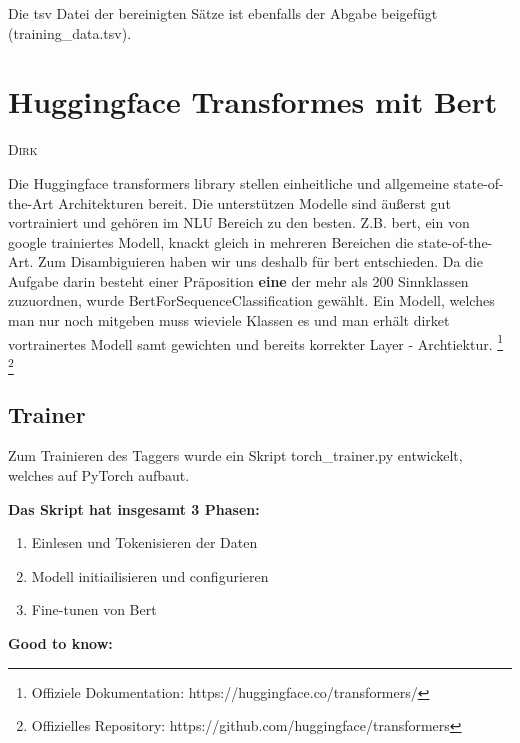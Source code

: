 \documentclass[10pt,a4paper]{article}
\newcommand{\chapterauthor}[1]{%
	{\parindent0pt\vspace*{-5pt}\hspace*{\fill}%
  \linespread{1.1}\large\scshape#1%
  \par\nobreak\vspace*{10pt}}
}
\begin{document}
Die tsv Datei der bereinigten Sätze ist ebenfalls der Abgabe beigefügt (training\_data.tsv).

\newpage

\section{Huggingface Transformes mit Bert}
\chapterauthor{Dirk}
Die Huggingface transformers library stellen einheitliche und allgemeine state-of-the-Art Architekturen bereit. Die unterstützen Modelle sind äußerst gut vortrainiert und gehören im NLU Bereich zu den besten. Z.B. bert, ein von google trainiertes Modell, knackt gleich in mehreren Bereichen die state-of-the-Art. Zum Disambiguieren haben wir uns deshalb für bert entschieden. Da die Aufgabe darin besteht einer Präposition \textbf{eine} der mehr als 200 Sinnklassen zuzuordnen, wurde BertForSequenceClassification gewählt. Ein Modell, welches man nur noch mitgeben muss wieviele Klassen es und man erhält dirket vortrainertes Modell samt gewichten und bereits korrekter Layer - Archtiektur. \footnote{Offiziele Dokumentation: https://huggingface.co/transformers/} \footnote{Offizielles Repository: https://github.com/huggingface/transformers}

\subsection{Trainer}
Zum Trainieren des Taggers wurde ein Skript torch\_trainer.py entwickelt, welches auf PyTorch aufbaut.

\vspace{0.25cm}
\textbf{Das Skript hat insgesamt 3 Phasen:}

\begin{enumerate}
	\item Einlesen und Tokenisieren der Daten
	\item Modell initiailisieren und configurieren
	\item Fine-tunen von Bert
\end{enumerate}


\textbf{Good to know:}
\end{document}
